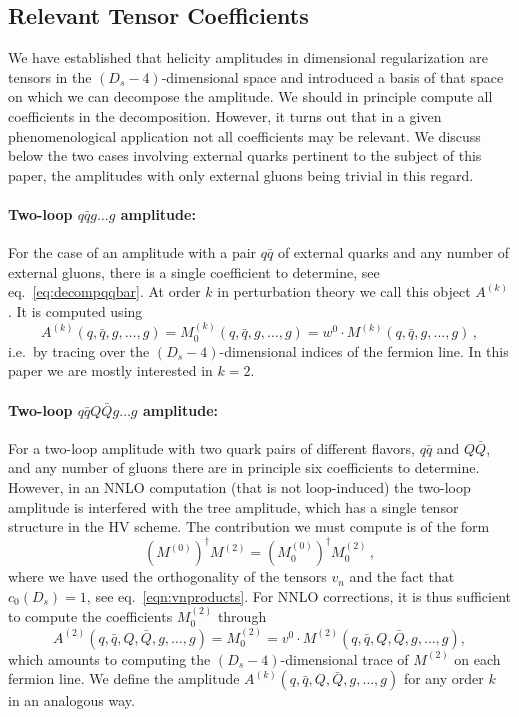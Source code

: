 \subsection{Relevant Tensor Coefficients}

We have established that helicity amplitudes in dimensional
regularization are tensors in the $(D_s-4)$-dimensional space and
introduced a basis of that space on which we can decompose the
amplitude.  We should in
principle compute all coefficients in the decomposition. However, it
turns out that in a given phenomenological application not all
coefficients may be relevant. We discuss below the two cases
involving external quarks pertinent to the subject of this 
paper, the amplitudes with only external gluons being trivial in
this regard.

\paragraph{Two-loop $q\bar qg\ldots g$ amplitude:}
For the case of an amplitude with a pair $q\bar q$ of external
quarks and any number of external gluons,
there is a single coefficient to determine, 
see eq.~\eqref{eq:decompqqbar}. At order $k$ in perturbation
theory we call this object $A^{(k)}$. It is
computed using
\begin{equation}\label{eq:qqProj}
    A^{(k)}(q,\bar q,g,\ldots,g)=M^{(k)}_0(q,\bar q,g,\ldots,g) =
	w^0\cdot M^{(k)}(q,\bar q,g,\ldots,g)\,,
\end{equation}
i.e.\ by
tracing over the $(D_s-4)$-dimensional indices of the
fermion line. In this paper we are mostly interested in $k=2$.

\paragraph{Two-loop $q\bar qQ\bar Qg\ldots g$ amplitude:}
For a
two-loop amplitude with two quark pairs of 
different flavors, $q\bar q$ and $Q\bar Q$, and any number of
gluons there are in principle six coefficients to determine. 
However, in an NNLO computation (that is not loop-induced) 
the two-loop amplitude is 
interfered with the tree amplitude, which has a single tensor
structure in the HV scheme. The contribution we must compute is of the form
\begin{equation}\label{eq:qqQQProj}
  \left(M^{(0)}\right)^\dagger M^{(2)}=
  \left(M^{(0)}_0\right)^\dagger M^{(2)}_0\,,
\end{equation}
where we have used the orthogonality of the tensors
$v_n$ and the fact that $c_0(D_s)=1$, see 
eq.~\eqref{eqn:vnproducts}. 
For NNLO corrections, it is
thus sufficient to compute the coefficients
$M^{(2)}_0$ through
\begin{equation}
  \label{eq:AmplitudeDefinition}
  A^{(2)}(q,\bar q,Q,\bar Q,g,\ldots,g)=
  M^{(2)}_0 = v^0 \cdot 
  M^{(2)}(q,\bar q,Q,\bar Q,g,\ldots,g),
\end{equation}
which amounts to computing the 
$(D_s-4)$-dimensional trace of $M^{(2)}$ on
each fermion line.  
We define the amplitude
$A^{(k)}(q,\bar q,Q,\bar Q,g,\ldots,g)$ for any order $k$
in an analogous way.

